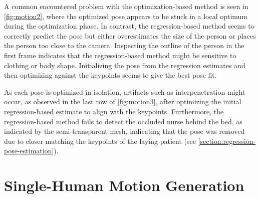 A common encountered problem with the optimization-based method is seen in \cref{fig:motion2}, where the optimized pose appears to be stuck in a local optimum during the optimization phase. In contrast, the regression-based method seems to correctly predict the pose but either overestimates the size of the person or places the person too close to the camera. Inspecting the outline of the person in the first frame indicates that the regression-based method might be sensitive to clothing or body shape. Initializing the pose from the regression estimates and then optimizing against the keypoints seems to give the best pose fit. 

As each pose is optimized in isolation, artifacts such as interpenetration might occur, as observed in the last row of \cref{fig:motion3}, after optimizing the initial regression-based estimate to align with the keypoints. Furthermore, the regression-based method fails to detect the occluded nurse behind the bed, as indicated by the semi-transparent mesh, indicating that the pose was removed due to closer matching the keypoints of the laying patient (see \cref{section:regression-pose-estimation}).



\section*{Single-Human Motion Generation}

